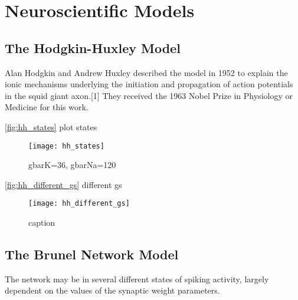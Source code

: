



\chapter{Neuroscientific Models}\label{chap:compneuro}


\section{The Hodgkin-Huxley Model}

Alan Hodgkin and Andrew Huxley described the model in 1952 to explain the ionic mechanisms underlying the initiation and propagation of action potentials in the squid giant axon.[1] They received the 1963 Nobel Prize in Physiology or Medicine for this work.

\autoref{fig:hh_states} plot states

\begin{figure}[H]
    \centering
    \texttt{[image: hh\_states]}
    \caption{gbarK=36, gbarNa=120
    }
    \label{fig:hh_states}
\end{figure}

\autoref{fig:hh_different_gs} different gs

\begin{figure}[H]
    \centering
    \texttt{[image: hh\_different\_gs]}
    \caption{caption
    }
    \label{fig:hh_different_gs}
\end{figure}

\section{The Brunel Network Model}

The network may be in several different states of spiking activity, largely dependent on the values of the synaptic weight parameters.

